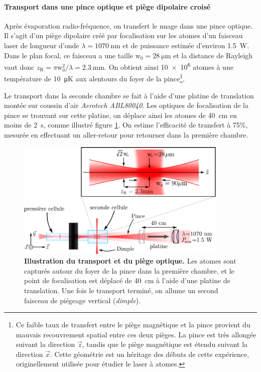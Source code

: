 \paragraph*{Transport dans une pince optique et piège dipolaire croisé}
Après évaporation radio-fréquence, on transfert le nuage dans une pince optique. Il s'agit d'un piège dipolaire créé par focalisation sur les atomes d'un faisceau laser de longueur d'onde $\lambda=\SI{1070}{\nano\metre}$ et de puissance estimée d'environ \SI{1.5}{\watt}. Dans le plan focal, ce faisceau a une taille $\mathrm{w}_{\mathrm{0}}=\SI{28}{\micro\metre}$ et la distance de Rayleigh vaut donc $z_{\mathrm{R}}= \pi \mathrm{w}_{\mathrm{0}}^2 / \lambda=\SI{2.3}{\milli\metre}$. On obtient ainsi \num{10e6} atomes à une température de \SI{10}{\micro\kelvin} aux alentours du foyer de la pince\footnote{Ce faible taux de transfert entre le piège magnétique et la pince provient du mauvais recouvrement spatial entre ces deux pièges. La pince est très allongée suivant la direction $\vec{z}$, tandis que le piège magnétique est étendu suivant la direction $\vec{x}$. Cette géométrie est un héritage des débuts de cette expérience, originellement utilisée pour étudier le laser à atomes.}.

Le transport dans la seconde chambre se fait à l'aide d'une platine de translation montée sur coussin d'air \emph{Aerotech ABL80040}. Les optiques de focalisation de la pince se trouvant sur cette platine, on déplace ainsi les atomes de \SI{40}{\centi\metre} en moins de \SI{2}{\second}, comme illustré figure \ref{fig:piege_optique}. On estime l'efficacité de transfert à 75\%, mesurée en effectuant un aller-retour pour retourner dans la première chambre.

\begin{figure}
\centering
\includegraphics[width=0.9\textwidth]{Fig/BEC_manip/piege_optique2.pdf}
\caption{\textbf{Illustration du transport et du piège optique.} Les atomes sont capturés autour du foyer de la pince dans la première chambre, et le point de focalisation est déplacé de \SI{40}{\centi\metre} à l'aide d'une platine de translation. Une fois le transport terminé, on allume un second faisceau de piégeage vertical (\emph{dimple}).}
\label{fig:piege_optique}
\end{figure}

